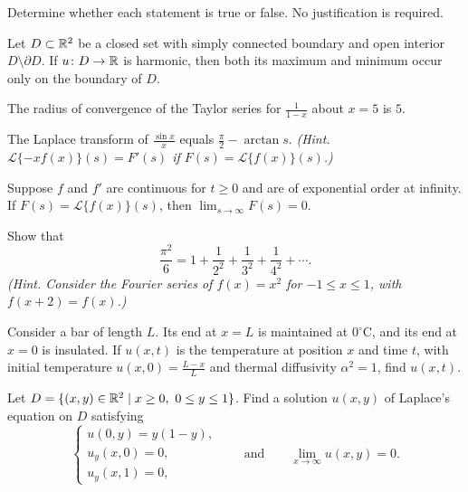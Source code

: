 \documentclass[11pt,oneside]{article}
\begin{document}
\begin{problem}
Determine whether each statement is true or false. No justification is required.
\begin{problemsubparts}
\item Let $D\subset\mathbb{R}^2$ be a closed set with simply connected boundary and open interior $D\setminus\partial D$. If $u\colon D\to\mathbb{R}$ is harmonic, then both its maximum and minimum occur only on the boundary of $D$.
\item The radius of convergence of the Taylor series for $\displaystyle\frac{1}{1-x}$ about $x=5$ is $5$.
\item The Laplace transform of $\displaystyle\frac{\sin x}{x}$ equals $\displaystyle\frac\pi2-\arctan s$. \textit{(Hint. $\mathcal L\{-xf(x)\}(s)=F'(s)$ if $F(s)=\mathcal L\{f(x)\}(s)$.)}
\item Suppose $f$ and $f'$ are continuous for $t\ge0$ and are of exponential order at infinity. If $F(s)=\mathcal L\{f(x)\}(s)$, then $\displaystyle\lim_{s\to\infty}F(s)=0$.
\end{problemsubparts}
\end{problem}

\begin{problem}
Show that
\[
\frac{\pi^2}{6}=1+\frac1{2^2}+\frac1{3^2}+\frac1{4^2}+\cdots.
\]
\textit{(Hint. Consider the Fourier series of $f(x)=x^2$ for $-1\le x\le1$, with $f(x+2)=f(x)$.)}
\end{problem}

\begin{problem}
Consider a bar of length $L$. Its end at $x=L$ is maintained at $0^\circ\mathrm C$, and its end at $x=0$ is insulated. If $u(x,t)$ is the temperature at position $x$ and time $t$, with initial temperature $\displaystyle u(x,0)=\frac{L-x}{L}$ and thermal diffusivity $\alpha^2=1$, find $u(x,t)$.
\end{problem}

\begin{problem}
Let $D=\{(x,y)\in\mathbb{R}^2\mid x\ge0,\ 0\le y\le1\}$. Find a solution $u(x,y)$ of Laplace's equation on $D$ satisfying
\[
\begin{cases}
u(0,y)=y(1-y),\\
u_y(x,0)=0,\\
u_y(x,1)=0,
\end{cases}
\qquad\text{and}\qquad\lim_{x\to\infty}u(x,y)=0.
\]
\end{problem}
\end{document}
